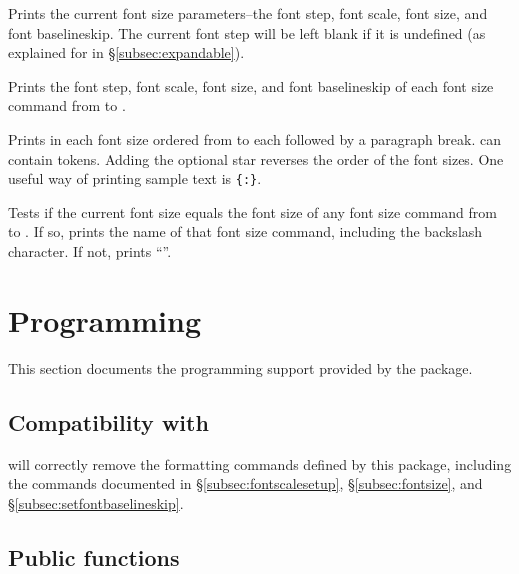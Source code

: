 \documentclass{beery}
\begin{document}
\KeepNextPar*

Prints the current font size parameters\---the font step, font scale, font size, and font baselineskip.
The current font step will be left blank if it is undefined (as explained for  in \S\ref{subsec:expandable}).

\KeepNextPar*

Prints the font step, font scale, font size, and font baselineskip of each font size command from  to .

 \sarg{} 
\KeepNextPar*

Prints  in each font size ordered from  to  each followed by a paragraph break.
 can contain  tokens.
Adding the optional star reverses the order of the font sizes.
One useful way of printing sample text is \allowbreak\texttt{\{:\allowbreak\textvisiblespace\allowbreak{}\}}.

\KeepNextPar*

Tests if the current font size equals the font size of any font size command from  to .
If so, prints the name of that font size command, including the backslash character.
If not, prints \enquote{\string\undefined}.


\section{Programming}
\label{sec:programming}

This section documents the  programming support provided by the  package.

\subsection
  {%
    Compatibility with
    \texorpdfstring
      {}
      {\textbackslash{}text\_purify:n}%
  }
\label{subsec:textpurify}

 will correctly remove the formatting commands defined by this package, including the commands documented in \S\ref{subsec:fontscalesetup}, \S\ref{subsec:fontsize}, and \S\ref{subsec:setfontbaselineskip}.

\subsection{Public functions}
\label{subsec:publicfunctions}
\end{document}

